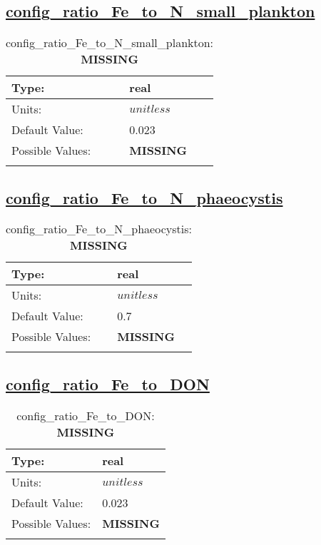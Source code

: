 \subsection[config\_ratio\_Fe\_to\_N\_small\_plankton]{\hyperref[sec:nm_tab_biogeochemistry]{config\_ratio\_Fe\_to\_N\_small\_plankton}}
\label{subsec:nm_sec_config_ratio_Fe_to_N_small_plankton}
\begin{center}
\begin{longtable}{| p{2.0in} || p{4.0in} |}
    \hline
    Type: & real \\
    \hline
    Units: & $unitless$ \\
    \hline
    Default Value: & 0.023 \\
    \hline
    Possible Values: & {\bf \color{red} MISSING} \\
    \hline
    \caption{config\_ratio\_Fe\_to\_N\_small\_plankton: {\bf \color{red} MISSING}}
\end{longtable}
\end{center}
\subsection[config\_ratio\_Fe\_to\_N\_phaeocystis]{\hyperref[sec:nm_tab_biogeochemistry]{config\_ratio\_Fe\_to\_N\_phaeocystis}}
\label{subsec:nm_sec_config_ratio_Fe_to_N_phaeocystis}
\begin{center}
\begin{longtable}{| p{2.0in} || p{4.0in} |}
    \hline
    Type: & real \\
    \hline
    Units: & $unitless$ \\
    \hline
    Default Value: & 0.7 \\
    \hline
    Possible Values: & {\bf \color{red} MISSING} \\
    \hline
    \caption{config\_ratio\_Fe\_to\_N\_phaeocystis: {\bf \color{red} MISSING}}
\end{longtable}
\end{center}
\subsection[config\_ratio\_Fe\_to\_DON]{\hyperref[sec:nm_tab_biogeochemistry]{config\_ratio\_Fe\_to\_DON}}
\label{subsec:nm_sec_config_ratio_Fe_to_DON}
\begin{center}
\begin{longtable}{| p{2.0in} || p{4.0in} |}
    \hline
    Type: & real \\
    \hline
    Units: & $unitless$ \\
    \hline
    Default Value: & 0.023 \\
    \hline
    Possible Values: & {\bf \color{red} MISSING} \\
    \hline
    \caption{config\_ratio\_Fe\_to\_DON: {\bf \color{red} MISSING}}
\end{longtable}
\end{center}

